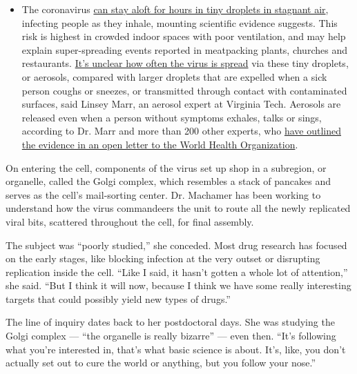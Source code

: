 \begin{itemize}
  \begin{itemize}
  \tightlist
  \item
    The coronavirus
    \href{https://www.nytimes.com/2020/07/04/health/239-experts-with-one-big-claim-the-coronavirus-is-airborne.html?action=click\&pgtype=Article\&state=default\&region=MAIN_CONTENT_3\&context=storylines_faq}{can
    stay aloft for hours in tiny droplets in stagnant air}, infecting
    people as they inhale, mounting scientific evidence suggests. This
    risk is highest in crowded indoor spaces with poor ventilation, and
    may help explain super-spreading events reported in meatpacking
    plants, churches and restaurants.
    \href{https://www.nytimes.com/2020/07/06/health/coronavirus-airborne-aerosols.html?action=click\&pgtype=Article\&state=default\&region=MAIN_CONTENT_3\&context=storylines_faq}{It's
    unclear how often the virus is spread} via these tiny droplets, or
    aerosols, compared with larger droplets that are expelled when a
    sick person coughs or sneezes, or transmitted through contact with
    contaminated surfaces, said Linsey Marr, an aerosol expert at
    Virginia Tech. Aerosols are released even when a person without
    symptoms exhales, talks or sings, according to Dr. Marr and more
    than 200 other experts, who
    \href{https://academic.oup.com/cid/article/doi/10.1093/cid/ciaa939/5867798}{have
    outlined the evidence in an open letter to the World Health
    Organization}.
  \end{itemize}
\end{itemize}

On entering the cell, components of the virus set up shop in a
subregion, or organelle, called the Golgi complex, which resembles a
stack of pancakes and serves as the cell's mail-sorting center. Dr.
Machamer has been working to understand how the virus commandeers the
unit to route all the newly replicated viral bits, scattered throughout
the cell, for final assembly.

The subject was ``poorly studied,'' she conceded. Most drug research has
focused on the early stages, like blocking infection at the very outset
or disrupting replication inside the cell. ``Like I said, it hasn't
gotten a whole lot of attention,'' she said. ``But I think it will now,
because I think we have some really interesting targets that could
possibly yield new types of drugs.''

The line of inquiry dates back to her postdoctoral days. She was
studying the Golgi complex --- ``the organelle is really bizarre'' ---
even then. ``It's following what you're interested in, that's what basic
science is about. It's, like, you don't actually set out to cure the
world or anything, but you follow your nose.''

